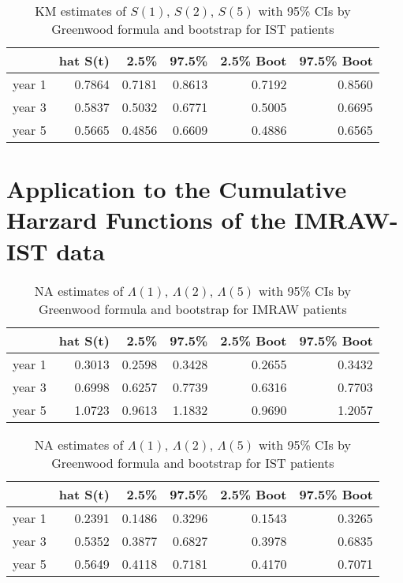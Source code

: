 \documentclass[11pt]{article}
\begin{document}
\begin{table}[H]
\centering
\begin{tabular}{rrrrrr}
  \hline
 & hat S(t) & 2.5\% & 97.5\% & 2.5\% Boot & 97.5\% Boot \\ 
  \hline
year 1 & 0.7864 & 0.7181 & 0.8613 & 0.7192 & 0.8560 \\ 
  year 3 & 0.5837 & 0.5032 & 0.6771 & 0.5005 & 0.6695 \\ 
  year 5 & 0.5665 & 0.4856 & 0.6609 & 0.4886 & 0.6565 \\ 
   \hline
\end{tabular}
\caption{KM estimates of $S(1)$, $S(2)$, $S(5)$
             with 95\% CIs by Greenwood formula and bootstrap for IST patients} 
\end{table}

\section{Application to the Cumulative Harzard Functions of the IMRAW-IST data}

\begin{table}[H]
\centering
\begin{tabular}{rrrrrr}
  \hline
 & hat S(t) & 2.5\% & 97.5\% & 2.5\% Boot & 97.5\% Boot \\ 
  \hline
year 1 & 0.3013 & 0.2598 & 0.3428 & 0.2655 & 0.3432 \\ 
  year 3 & 0.6998 & 0.6257 & 0.7739 & 0.6316 & 0.7703 \\ 
  year 5 & 1.0723 & 0.9613 & 1.1832 & 0.9690 & 1.2057 \\ 
   \hline
\end{tabular}
\caption{NA estimates of $\Lambda(1)$, $\Lambda(2)$, $\Lambda(5)$ 
             with 95\% CIs by Greenwood formula and bootstrap for IMRAW patients} 
\end{table}

\begin{table}[H]
\centering
\begin{tabular}{rrrrrr}
  \hline
 & hat S(t) & 2.5\% & 97.5\% & 2.5\% Boot & 97.5\% Boot \\ 
  \hline
year 1 & 0.2391 & 0.1486 & 0.3296 & 0.1543 & 0.3265 \\ 
  year 3 & 0.5352 & 0.3877 & 0.6827 & 0.3978 & 0.6835 \\ 
  year 5 & 0.5649 & 0.4118 & 0.7181 & 0.4170 & 0.7071 \\ 
   \hline
\end{tabular}
\caption{NA estimates of $\Lambda(1)$, $\Lambda(2)$, $\Lambda(5)$ 
             with 95\% CIs by Greenwood formula and bootstrap for IST patients} 
\end{table}
\end{document}
